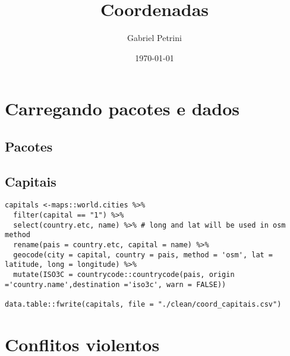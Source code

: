 \documentclass[11pt]{article}
\author{Gabriel Petrini}
\date{\today}
\title{Coordenadas}
\begin{document}
\maketitle
\tableofcontents


\section*{Carregando pacotes e dados}
\label{sec:orgb4a445d}

\subsection*{Pacotes}
\label{sec:orgc299fde}

\subsection*{Capitais}
\label{sec:orgcbc5405}

\begin{verbatim}
capitals <-maps::world.cities %>%
  filter(capital == "1") %>%
  select(country.etc, name) %>% # long and lat will be used in osm method
  rename(pais = country.etc, capital = name) %>%
  geocode(city = capital, country = pais, method = 'osm', lat = latitude, long = longitude) %>%
  mutate(ISO3C = countrycode::countrycode(pais, origin ='country.name',destination ='iso3c', warn = FALSE))

data.table::fwrite(capitals, file = "./clean/coord_capitais.csv")
\end{verbatim}

\section*{Conflitos violentos}
\label{sec:org02ee177}
\end{document}
